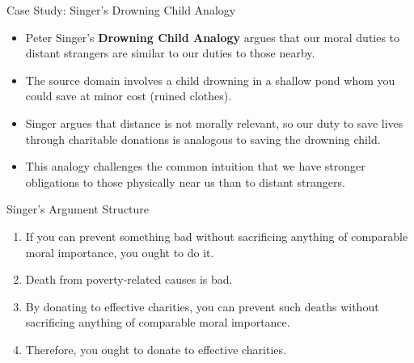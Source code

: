 \documentclass{beamer}
\begin{document}
	\begin{frame}{Case Study: Singer's Drowning Child Analogy}
		\begin{itemize}
			\item Peter Singer's \textbf{Drowning Child Analogy} argues that our moral duties to distant strangers are similar to our duties to those nearby.
			\item The source domain involves a child drowning in a shallow pond whom you could save at minor cost (ruined clothes).
			\item Singer argues that distance is not morally relevant, so our duty to save lives through charitable donations is analogous to saving the drowning child.
			\item This analogy challenges the common intuition that we have stronger obligations to those physically near us than to distant strangers.
		\end{itemize}
		
		\begin{block}{Singer's Argument Structure}
			\scriptsize
			\begin{enumerate}
				\item If you can prevent something bad without sacrificing anything of comparable moral importance, you ought to do it.
				\item Death from poverty-related causes is bad.
				\item By donating to effective charities, you can prevent such deaths without sacrificing anything of comparable moral importance.
				\item Therefore, you ought to donate to effective charities.
			\end{enumerate}
		\end{block}
	\end{frame}
	
\end{document}
